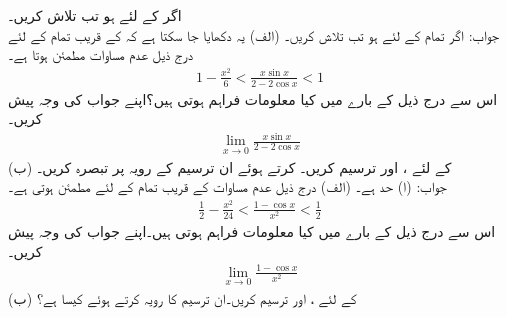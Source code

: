 
اگر  کے لئے  ہو تب  تلاش کریں۔\\
جواب: 
اگر تمام  کے لئے  ہو تب  تلاش کریں۔
(الف) \quad
یہ دکھایا جا سکتا ہے کہ  کے قریب تمام  کے لئے درج ذیل عدم مساوات مطمئن ہوتا ہے۔
\begin{align*}
1-\frac{x^2}{6}<\frac{x\sin x}{2-2\cos x}<1
\end{align*}
اس سے درج ذیل کے بارے میں کیا معلومات فراہم ہوتی ہیں؟اپنے جواب کی وجہ پیش کریں۔
\begin{align*}
\lim_{x\to 0} \frac{x\sin x}{2-2\cos x}
\end{align*}
(ب)\quad
{} کے لئے ،  اور  ترسیم کریں۔  کرتے ہوئے ان  ترسیم کے رویہ پر تبصرہ کریں۔\\
جواب: (ا) حد  ہے۔
(الف) \quad
درج ذیل عدم مساوات  کے قریب تمام  کے لئے مطمئن ہوتی ہے۔
\begin{align*}
\frac{1}{2}-\frac{x^2}{24}<\frac{1-\cos x}{x^2}<\frac{1}{2}
\end{align*} 
اس سے درج ذیل کے بارے میں کیا معلومات فراہم ہوتی ہیں۔اپنے جواب کی وجہ پیش کریں۔
\begin{align*}
\lim_{x\to 0}\frac{1-\cos x}{x^2}
\end{align*}
(ب)\quad
{} کے لئے ،  اور  ترسیم کریں۔ان ترسیم کا رویہ   کرتے ہوئے کیسا ہے؟



